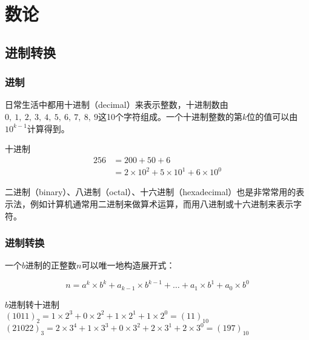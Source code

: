 \chapter{数论}

\section{进制转换}

\subsection{进制}

日常生活中都用十进制（decimal）来表示整数，十进制数由$ 0,\ 1,\ 2,\ 3,\ 4,\ 5,\ 6,\ 7,\ 8,\ 9 $这10个字符组成。一个十进制整数的第$ k $位的值可以由$ 10^{k-1} $计算得到。

\begin{tcolorbox}
	十进制
	\begin{align*}
		256 & = 200 + 50 + 6                                  \\
		    & = 2 \times 10^2 + 5 \times 10^1 + 6 \times 10^0
	\end{align*}
\end{tcolorbox}

二进制（binary）、八进制（octal）、十六进制（hexadecimal）也是非常常用的表示法，例如计算机通常用二进制来做算术运算，而用八进制或十六进制来表示字符。\\

\subsection{进制转换}

一个$ b $进制的正整数$ n $可以唯一地构造展开式：

\vspace{-0.5cm}

$$
	n = a^k \times b^k + a_{k-1} \times b^{k-1} + \dots + a_1 \times b^1 + a_0 \times b^0
$$

\begin{tcolorbox}
	$ b $进制转十进制\\
	$ (1011)_2 = 1 \times 2^3 + 0 \times 2^2 + 1 \times 2^1 + 1 \times 2^0 = (11)_{10} $\\
	$ (21022)_3 = 2 \times 3^4 + 1 \times 3^3 + 0 \times 3^2 + 2 \times 3^1 + 2 \times 3^0 = (197)_{10} $
\end{tcolorbox}

